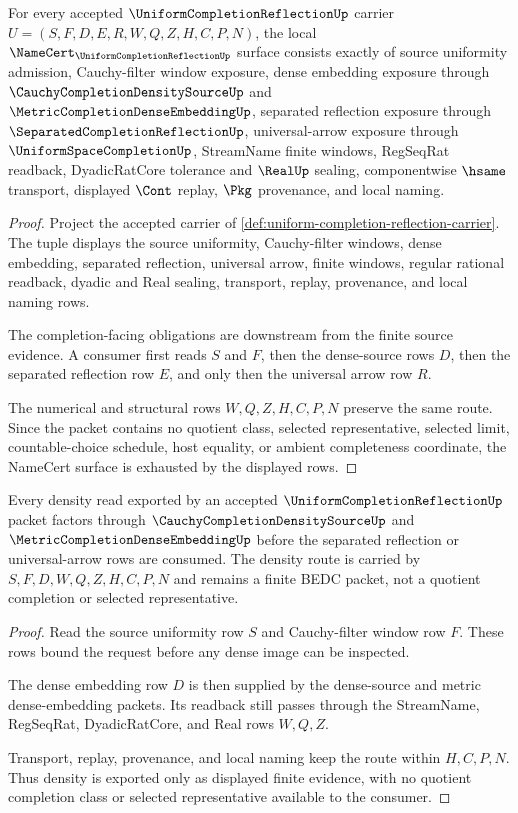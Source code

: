 \begin{theorem}
\label{thm:uniform-completion-reflection-namecert-obligations}
For every accepted $\UniformCompletionReflectionUp$ carrier $U=(S,F,D,E,R,W,Q,Z,H,C,P,N)$, the local $\NameCert_{\UniformCompletionReflectionUp}$ surface consists exactly of source uniformity admission, Cauchy-filter window exposure, dense embedding exposure through $\CauchyCompletionDensitySourceUp$ and $\MetricCompletionDenseEmbeddingUp$, separated reflection exposure through $\SeparatedCompletionReflectionUp$, universal-arrow exposure through $\UniformSpaceCompletionUp$, StreamName finite windows, RegSeqRat readback, DyadicRatCore tolerance and $\RealUp$ sealing, componentwise $\hsame$ transport, displayed $\Cont$ replay, $\Pkg$ provenance, and local naming.
\end{theorem}
\begin{proof}
Project the accepted carrier of \autoref{def:uniform-completion-reflection-carrier}. The tuple displays the source uniformity, Cauchy-filter windows, dense embedding, separated reflection, universal arrow, finite windows, regular rational readback, dyadic and Real sealing, transport, replay, provenance, and local naming rows.

The completion-facing obligations are downstream from the finite source evidence. A consumer first reads $S$ and $F$, then the dense-source rows $D$, then the separated reflection row $E$, and only then the universal arrow row $R$.

The numerical and structural rows $W,Q,Z,H,C,P,N$ preserve the same route. Since the packet contains no quotient class, selected representative, selected limit, countable-choice schedule, host equality, or ambient completeness coordinate, the NameCert surface is exhausted by the displayed rows.
\end{proof}

\begin{theorem}
\label{thm:uniform-completion-reflection-density}
Every density read exported by an accepted $\UniformCompletionReflectionUp$ packet factors through $\CauchyCompletionDensitySourceUp$ and $\MetricCompletionDenseEmbeddingUp$ before the separated reflection or universal-arrow rows are consumed. The density route is carried by $S,F,D,W,Q,Z,H,C,P,N$ and remains a finite BEDC packet, not a quotient completion or selected representative.
\end{theorem}
\begin{proof}
Read the source uniformity row $S$ and Cauchy-filter window row $F$. These rows bound the request before any dense image can be inspected.

The dense embedding row $D$ is then supplied by the dense-source and metric dense-embedding packets. Its readback still passes through the StreamName, RegSeqRat, DyadicRatCore, and Real rows $W,Q,Z$.

Transport, replay, provenance, and local naming keep the route within $H,C,P,N$. Thus density is exported only as displayed finite evidence, with no quotient completion class or selected representative available to the consumer.
\end{proof}

